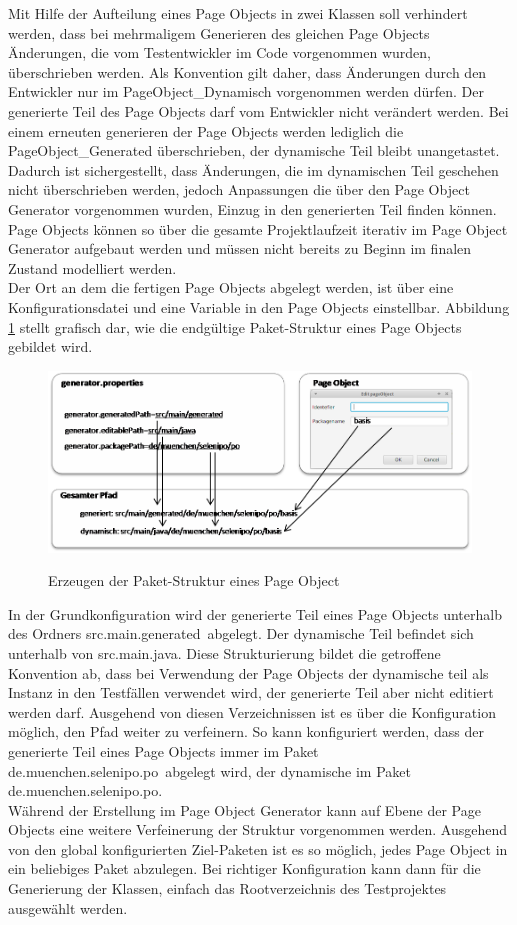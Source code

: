 Mit Hilfe der Aufteilung eines Page Objects in zwei Klassen soll verhindert werden, dass bei mehrmaligem Generieren des gleichen Page Objects Änderungen, die vom Testentwickler im Code vorgenommen wurden, überschrieben werden. Als Konvention gilt daher, dass Änderungen durch den Entwickler nur im PageObject\_Dynamisch vorgenommen werden dürfen. Der generierte Teil des Page Objects darf vom Entwickler nicht verändert werden.
Bei einem erneuten generieren der Page Objects werden lediglich die PageObject\_Generated überschrieben, der dynamische Teil bleibt unangetastet.
Dadurch ist sichergestellt, dass Änderungen, die im dynamischen Teil geschehen nicht überschrieben werden, jedoch Anpassungen die über den Page Object Generator vorgenommen wurden, Einzug in den generierten Teil finden können.
Page Objects können so über die gesamte Projektlaufzeit iterativ im Page Object Generator aufgebaut werden und müssen nicht bereits zu Beginn im finalen Zustand modelliert werden.\\
Der Ort an dem die fertigen Page Objects abgelegt werden, ist über eine Konfigurationsdatei und eine Variable in den Page Objects einstellbar. 
Abbildung \ref{fig:packagepath} stellt grafisch dar, wie die endgültige Paket-Struktur eines Page Objects gebildet wird.
\begin{figure}[htb]
  \centering  
  \includegraphics[scale=0.8]{img/packagePath.png}\\
  \caption{Erzeugen der Paket-Struktur eines Page Object}
  \label{fig:packagepath}
\end{figure}
In der Grundkonfiguration wird der generierte Teil eines Page Objects unterhalb des Ordners \grq src.main.generated\grq\ abgelegt. Der dynamische Teil befindet sich unterhalb von \grq src.main.java\grq.
Diese Strukturierung bildet die getroffene Konvention ab, dass bei Verwendung der Page Objects der dynamische teil als Instanz in den Testfällen verwendet wird, der generierte Teil aber nicht editiert werden darf.
Ausgehend von diesen Verzeichnissen ist es über die Konfiguration möglich, den Pfad weiter zu verfeinern. So kann konfiguriert werden, dass der generierte Teil eines Page Objects immer im Paket \grq de.muenchen.selenipo.po\grq\ abgelegt wird, der dynamische im Paket \grq de.muenchen.selenipo.po\grq.\\
Während der Erstellung im Page Object Generator kann auf Ebene der Page Objects eine weitere Verfeinerung der Struktur vorgenommen werden. Ausgehend von den global konfigurierten Ziel-Paketen ist es so möglich, jedes Page Object in ein beliebiges Paket abzulegen.
Bei richtiger Konfiguration kann dann für die Generierung der Klassen, einfach das Rootverzeichnis des Testprojektes ausgewählt werden.

